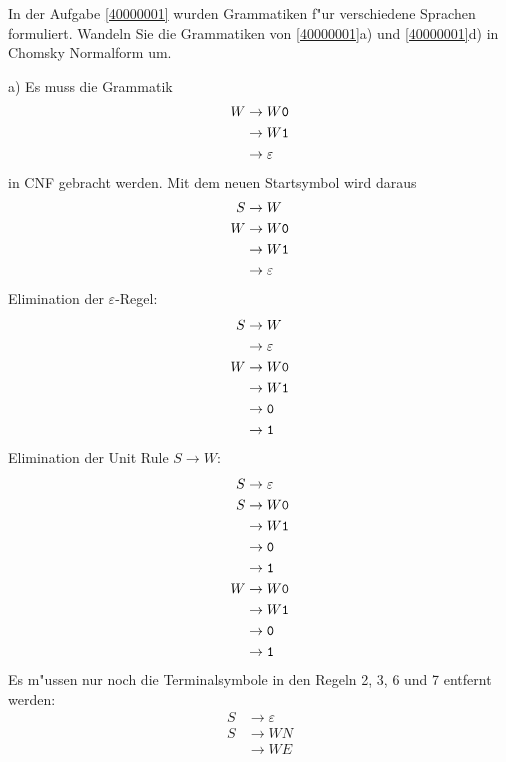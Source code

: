 In der Aufgabe \ref{40000001} wurden Grammatiken f"ur verschiedene
Sprachen formuliert.
Wandeln Sie die Grammatiken von \ref{40000001}a) und \ref{40000001}d) in Chomsky Normalform um.

\begin{loesung}
\begin{teilaufgaben}
\item[a)] Es muss die Grammatik
\begin{align*}
W&\rightarrow W{\tt 0}\\
 &\rightarrow W{\tt 1}\\
 &\rightarrow\varepsilon
\end{align*}
in CNF gebracht werden. Mit dem neuen Startsymbol wird daraus
\begin{align*}
S&\rightarrow W\\
W&\rightarrow W{\tt 0}\\
 &\rightarrow W{\tt 1}\\
 &\rightarrow\varepsilon
\end{align*}
Elimination der $\varepsilon$-Regel:
\begin{align*}
S&\rightarrow W\\
 &\rightarrow \varepsilon\\
W&\rightarrow W{\tt 0}\\
 &\rightarrow W{\tt 1}\\
 &\rightarrow {\tt 0}\\
 &\rightarrow {\tt 1}\\
\end{align*}
Elimination der Unit Rule $S\to W$:
\begin{align*}
S&\rightarrow \varepsilon\\
S&\rightarrow W{\tt 0}\\
 &\rightarrow W{\tt 1}\\
 &\rightarrow {\tt 0}\\
 &\rightarrow {\tt 1}\\
W&\rightarrow W{\tt 0}\\
 &\rightarrow W{\tt 1}\\
 &\rightarrow {\tt 0}\\
 &\rightarrow {\tt 1}\\
\end{align*}
Es m"ussen nur noch die Terminalsymbole in den Regeln 2, 3, 6 und 7
entfernt werden:
\begin{align*}
S&\rightarrow \varepsilon\\
S&\rightarrow WN\\
 &\rightarrow WE\\

\end{align*}
\end{teilaufgaben}
\end{loesung}
